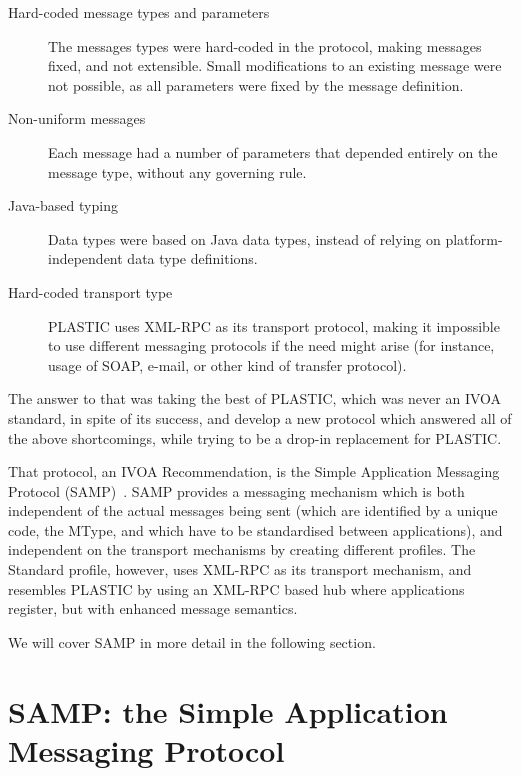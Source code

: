 		\begin{description}
			\item[Hard-coded message types and parameters]
			The messages types were hard-coded in the protocol,
			making messages fixed, and not extensible. Small
			modifications to an existing message were not
			possible, as all parameters were fixed by the
			message definition.
			
			\item[Non-uniform messages] Each message had a
			number of parameters that depended entirely on
			the message type, without any governing rule.
			
			\item[Java-based typing] Data types were based on
			Java data types, instead of relying on
			platform-independent data type definitions.
			
			\item[Hard-coded transport type] PLASTIC uses
			XML-RPC as its transport protocol, making it
			impossible to use different messaging protocols
			if the need might arise (for instance, usage of
			SOAP, e-mail, or other kind of transfer protocol).
		\end{description}
		
		The answer to that was taking the best of PLASTIC, 
		which was never an IVOA standard, in spite of its 
		success, and develop a new protocol which answered
		all of the above shortcomings, while trying to be
		a drop-in replacement for PLASTIC.
		
		That protocol, an IVOA Recommendation, is the Simple
		Application Messaging Protocol
		(SAMP)~\cite{2009samp.ivoav0904T}. SAMP provides a
		messaging mechanism which is both independent of the
		actual messages being sent (which are identified by
		a unique code, the MType, and which have to be 
		standardised between applications), and independent
		on the transport mechanisms by creating different
		profiles. The Standard profile, however, uses XML-RPC
		as its transport mechanism, and resembles PLASTIC by
		using an XML-RPC based hub where applications register,
		but with enhanced message semantics.
		
		We will cover SAMP in more detail in the following
		section.
		
	
	\section{SAMP: the Simple Application Messaging Protocol} %
	\label{sec:samp_messaging}
		

